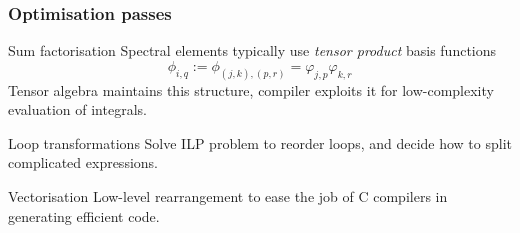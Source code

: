 \documentclass[presentation]{beamer}
\begin{document}
\begin{frame}
  \frametitle{Optimisation passes}
  \begin{block}{Sum factorisation}
    Spectral elements typically use \emph{tensor product} basis functions
    \begin{equation*}
      \phi_{i,q} := \phi_{(j,k),(p,r)} = \varphi_{j,p}\varphi_{k,r}
    \end{equation*}
    Tensor algebra maintains this structure, compiler exploits it for
    low-complexity evaluation of integrals.
  \end{block}
  \begin{block}{Loop transformations}
    Solve ILP problem to reorder loops, and decide how to split
    complicated expressions.
  \end{block}
  \begin{block}{Vectorisation}
    Low-level rearrangement to ease the job of C compilers in
    generating efficient code.
  \end{block}

\end{frame}
\end{document}

